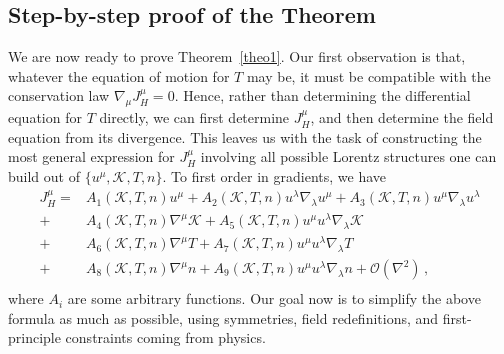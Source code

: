 \documentclass[a4paper, amsfonts, amssymb, amsmath, reprint, showkeys, nofootinbib, twoside, onecolumn,notitlepage]{revtex4-1}
\newcommand{\K}{{\mathcal{K}}}
\theoremstyle{definition}
\theoremstyle{theorem}
\begin{document}
\vspace{-0.2cm}
\subsection{Step-by-step proof of the Theorem}
\vspace{-0.2cm}

We are now ready to prove Theorem~\ref{theo1}. Our first observation is that, whatever the equation of motion for $T$ may be, it must be compatible with the conservation law $\nabla_\mu J_H^\mu =0$. Hence, rather than determining the differential equation for $T$ directly, we can first determine $J_H^\mu$, and then determine the field equation from its divergence. This leaves us with the task of constructing the most general expression for $J_H^\mu$ involving all possible Lorentz structures one can build out of $\{u^\mu, \K,T,n \}$. To first order in gradients, we have
\begin{equation}\label{BDNKov}
\begin{split}
J^\mu_H ={}& A_1(\K,T,n) u^\mu+A_2(\K,T,n) u^\lambda \nabla_\lambda u^\mu +A_3(\K ,T,n)u^\mu \nabla_\lambda u^\lambda \\ 
+{}& A_4 (\K,T,n) \nabla^\mu \K  + A_5(\K,T,n) u^\mu u^\lambda \nabla_\lambda \K   \\
+{}& A_6(\K,T,n)\nabla^\mu T+A_7(\K,T,n) u^\mu u^\lambda \nabla_\lambda T\\
+{}& A_8(\K,T,n)\nabla^\mu n+A_9(\K,T,n) u^\mu u^\lambda \nabla_\lambda n +\mathcal{O}(\nabla^2) \, ,\\
\end{split}    
\end{equation}
where $A_i$ are some arbitrary functions. Our goal now is to simplify the above formula as much as possible, using symmetries, field redefinitions, and first-principle constraints coming from physics. 
\end{document}
